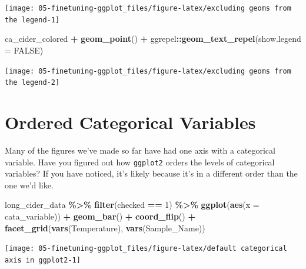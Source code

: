 \documentclass[
]{book}
\newenvironment{Shaded}{\begin{snugshade}}{\end{snugshade}}
\newcommand{\AttributeTok}[1]{\textcolor[rgb]{0.13,0.29,0.53}{#1}}
\newcommand{\ConstantTok}[1]{\textcolor[rgb]{0.56,0.35,0.01}{#1}}
\newcommand{\DecValTok}[1]{\textcolor[rgb]{0.00,0.00,0.81}{#1}}
\newcommand{\FunctionTok}[1]{\textcolor[rgb]{0.13,0.29,0.53}{\textbf{#1}}}
\newcommand{\NormalTok}[1]{#1}
\newcommand{\SpecialCharTok}[1]{\textcolor[rgb]{0.81,0.36,0.00}{\textbf{#1}}}
\begin{document}
\begin{center}\texttt{[image: 05-finetuning-ggplot\_files/figure-latex/excluding geoms from the legend-1]} \end{center}

\begin{Shaded}
\begin{Highlighting}[]
\NormalTok{ca\_cider\_colored }\SpecialCharTok{+}
  \FunctionTok{geom\_point}\NormalTok{() }\SpecialCharTok{+}
\NormalTok{  ggrepel}\SpecialCharTok{::}\FunctionTok{geom\_text\_repel}\NormalTok{(}\AttributeTok{show.legend =} \ConstantTok{FALSE}\NormalTok{)}
\end{Highlighting}
\end{Shaded}

\begin{center}\texttt{[image: 05-finetuning-ggplot\_files/figure-latex/excluding geoms from the legend-2]} \end{center}

\hypertarget{ordered-categorical-variables}{%
\section{Ordered Categorical Variables}\label{ordered-categorical-variables}}

Many of the figures we've made so far have had one axis with a categorical variable. Have you figured out how \texttt{ggplot2} orders the levels of categorical variables? If you have noticed, it's likely because it's in a different order than the one we'd like.

\begin{Shaded}
\begin{Highlighting}[]
\NormalTok{long\_cider\_data }\SpecialCharTok{\%\textgreater{}\%}
  \FunctionTok{filter}\NormalTok{(checked }\SpecialCharTok{==} \DecValTok{1}\NormalTok{) }\SpecialCharTok{\%\textgreater{}\%}
  \FunctionTok{ggplot}\NormalTok{(}\FunctionTok{aes}\NormalTok{(}\AttributeTok{x =}\NormalTok{ cata\_variable)) }\SpecialCharTok{+}
  \FunctionTok{geom\_bar}\NormalTok{() }\SpecialCharTok{+}
  \FunctionTok{coord\_flip}\NormalTok{() }\SpecialCharTok{+}
  \FunctionTok{facet\_grid}\NormalTok{(}\FunctionTok{vars}\NormalTok{(Temperature), }\FunctionTok{vars}\NormalTok{(Sample\_Name))}
\end{Highlighting}
\end{Shaded}

\begin{center}\texttt{[image: 05-finetuning-ggplot\_files/figure-latex/default categorical axis in ggplot2-1]} \end{center}
\end{document}

